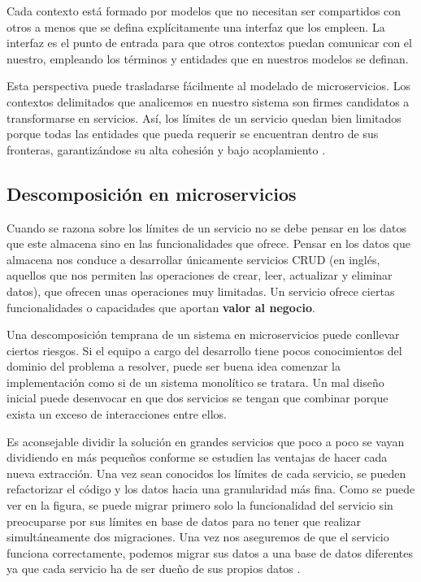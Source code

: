 \documentclass[11pt,spanish,listoffigures]{tfgetsinf}
\begin{document}
Cada contexto está formado por modelos que no necesitan ser compartidos con otros a menos que se defina explícitamente una interfaz que los empleen. La interfaz es el punto de entrada para que otros contextos puedan comunicar con el nuestro, empleando los términos y entidades que en nuestros modelos se definan.

Esta perspectiva puede trasladarse fácilmente al modelado de microservicios. Los contextos delimitados que analicemos en nuestro sistema son firmes candidatos a transformarse en servicios. Así, los límites de un servicio quedan bien limitados porque  todas las entidades que pueda requerir se encuentran dentro de sus fronteras, garantizándose su alta cohesión y bajo acoplamiento \cite{Newman2015a}.

\subsection{Descomposición en microservicios} \label{subsect:Descomposicion}

Cuando se razona sobre los límites de un servicio no se debe pensar en los datos que este almacena sino en las funcionalidades que ofrece. Pensar en los datos que almacena nos conduce a desarrollar únicamente servicios CRUD (en inglés, aquellos que nos permiten las operaciones de crear, leer, actualizar y eliminar datos), que ofrecen unas operaciones muy limitadas. Un servicio ofrece ciertas funcionalidades o capacidades que aportan \textbf{valor al negocio}.

Una descomposición temprana de un sistema en microservicios puede conllevar ciertos riesgos. Si el equipo a cargo del desarrollo tiene pocos conocimientos del dominio del problema a resolver, puede  ser buena idea comenzar la implementación como si de un sistema monolítico se tratara. Un mal diseño inicial puede desenvocar en que dos servicios se tengan que combinar porque exista un exceso de interacciones entre ellos. 

Es aconsejable dividir la solución en grandes servicios que poco a poco se vayan dividiendo en más pequeños conforme se estudien las ventajas de hacer cada nueva extracción. Una vez sean conocidos los límites de cada servicio, se pueden refactorizar el código y los datos hacia una granularidad más fina. Como se puede ver en la figura, se puede migrar primero solo la funcionalidad del servicio sin preocuparse por sus límites en base de datos para no tener que realizar simultáneamente dos migraciones. Una vez nos aseguremos de que el servicio funciona correctamente, podemos migrar sus datos a una base de datos diferentes ya que cada servicio ha de ser dueño de sus propios datos \cite{Richards2016}.
\end{document}
